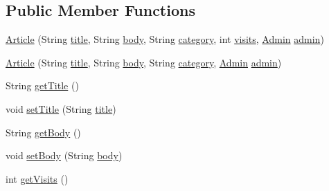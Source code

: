 \subsection*{Public Member Functions}
\begin{DoxyCompactItemize}
\item 
\hyperlink{classes_1_1deusto_1_1server_1_1jdo_1_1_article_a74089feda9d822eb36d981dccb7bc4c7}{Article} (String \hyperlink{classes_1_1deusto_1_1server_1_1jdo_1_1_article_a94695d557769f2abe9dee76224e4376b}{title}, String \hyperlink{classes_1_1deusto_1_1server_1_1jdo_1_1_article_a1dd07a7780e5b7f0bedd0fbabf85d587}{body}, String \hyperlink{classes_1_1deusto_1_1server_1_1jdo_1_1_article_a4ece506f3c446ae045c821f68fd335ce}{category}, int \hyperlink{classes_1_1deusto_1_1server_1_1jdo_1_1_article_aa2d904e39c1518acd505ebd21b9bd156}{visits}, \hyperlink{classes_1_1deusto_1_1server_1_1jdo_1_1_admin}{Admin} \hyperlink{classes_1_1deusto_1_1server_1_1jdo_1_1_article_a3c67e3be7d33d08209a92817a69d9020}{admin})
\item 
\hyperlink{classes_1_1deusto_1_1server_1_1jdo_1_1_article_a083d627c016ba19fad5f4a719da72cd4}{Article} (String \hyperlink{classes_1_1deusto_1_1server_1_1jdo_1_1_article_a94695d557769f2abe9dee76224e4376b}{title}, String \hyperlink{classes_1_1deusto_1_1server_1_1jdo_1_1_article_a1dd07a7780e5b7f0bedd0fbabf85d587}{body}, String \hyperlink{classes_1_1deusto_1_1server_1_1jdo_1_1_article_a4ece506f3c446ae045c821f68fd335ce}{category}, \hyperlink{classes_1_1deusto_1_1server_1_1jdo_1_1_admin}{Admin} \hyperlink{classes_1_1deusto_1_1server_1_1jdo_1_1_article_a3c67e3be7d33d08209a92817a69d9020}{admin})
\item 
String \hyperlink{classes_1_1deusto_1_1server_1_1jdo_1_1_article_a2b35e53280b447706cfe2ee8c8eabaac}{get\+Title} ()
\item 
void \hyperlink{classes_1_1deusto_1_1server_1_1jdo_1_1_article_a9ce648f3e251a70a23f095049cd42e63}{set\+Title} (String \hyperlink{classes_1_1deusto_1_1server_1_1jdo_1_1_article_a94695d557769f2abe9dee76224e4376b}{title})
\item 
String \hyperlink{classes_1_1deusto_1_1server_1_1jdo_1_1_article_a8fa1d3a79b76f42058e922c4e32fb197}{get\+Body} ()
\item 
void \hyperlink{classes_1_1deusto_1_1server_1_1jdo_1_1_article_a5160202c2a15e13a3acb376be95af99c}{set\+Body} (String \hyperlink{classes_1_1deusto_1_1server_1_1jdo_1_1_article_a1dd07a7780e5b7f0bedd0fbabf85d587}{body})
\item 
int \hyperlink{classes_1_1deusto_1_1server_1_1jdo_1_1_article_a0d14a1b74ec663f4e25780f9d1b2cf4f}{get\+Visits} ()

\end{DoxyCompactItemize}
